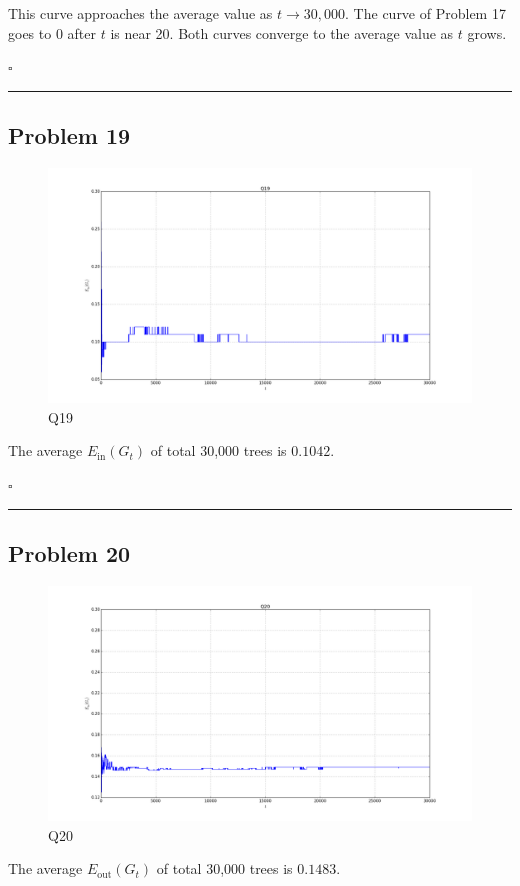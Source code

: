 \documentclass[12pt]{article}
\newcommand*{\QEDB}{\hfill\ensuremath{\square}}
\newcommand{\ParTh}[1]{\left(#1\right)}
\newcommand{\horrule}[1]{\rule{\linewidth}{#1}}
\begin{document}
This curve approaches the average value as $t\rightarrow30,000$. The curve of Problem 17 goes to 0 after $t$ is near 20. Both curves converge to the average value as $t$ grows.

\QEDB

\horrule{0.5pt}

\subsection*{Problem 19}

\begin{figure}[H]
	\centering
	\includegraphics[scale=0.3]{Q19.png}
	\caption{Q19}
	\label{Q19}
\end{figure}
The average $E_{\text{in}}\ParTh{G_t}$ of total 30,000 trees is $0.1042$.

\QEDB

\horrule{0.5pt}

\subsection*{Problem 20}

\begin{figure}[H]
	\centering
	\includegraphics[scale=0.3]{Q20.png}
	\caption{Q20}
	\label{Q20}
\end{figure}
The average $E_{\text{out}}\ParTh{G_t}$ of total 30,000 trees is $0.1483$.
\end{document}

